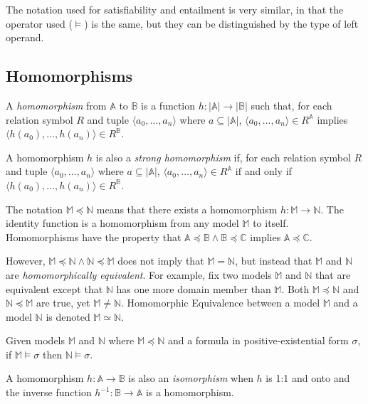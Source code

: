 		The notation used for satisfiability and entailment is very similar, in
		that the operator used ($\models$) is the same, but they can be
		distinguished by the type of left operand.

	\subsection{Homomorphisms}

		A \emph{homomorphism} from $\mathbb{A}$ to $\mathbb{B}$ is a function
		$h: |\mathbb{A}|\to|\mathbb{B}|$ such that, for each relation symbol
		$R$ and tuple $\langle a_0 , \ldots , a_n \rangle$ where $a \subseteq
		|\mathbb{A}|$, $\langle a_0 , \ldots , a_n  \rangle \in R^\mathbb{A}$
		implies $\langle h(a_0) , \ldots , h(a_n) \rangle \in R^\mathbb{B}$.

		A homomorphism $h$ is also a \emph{strong homomorphism} if, for each
		relation symbol $R$ and tuple $\langle a_0 , \ldots , a_n \rangle$
		where $a \subseteq |\mathbb{A}|$, $\langle a_0 , \ldots , a_n  \rangle
		\in R^\mathbb{A}$ if and only if $\langle h(a_0) , \ldots , h(a_n)
		\rangle \in R^\mathbb{B}$.

		The notation $\mathbb{M} \preceq \mathbb{N}$ means that there exists a
		homomorphism $h : \mathbb{M} \to \mathbb{N}$. The identity function is
		a homomorphism from any model $\mathbb{M}$ to itself.  Homomorphisms
		have the property that $\mathbb{A} \preceq \mathbb{B} \wedge \mathbb{B}
		\preceq \mathbb{C}$ implies $\mathbb{A} \preceq \mathbb{C}$.

		However, $\mathbb{M} \preceq \mathbb{N} \wedge \mathbb{N} \preceq
		\mathbb{M}$ does not imply that $\mathbb{M} = \mathbb{N}$, but instead
		that $\mathbb{M}$ and $\mathbb{N}$ are \emph{homomorphically
		equivalent}.  For example, fix two models $\mathbb{M}$ and $\mathbb{N}$
		that are equivalent except that $\mathbb{N}$ has one more domain
		member than $\mathbb{M}$. Both $\mathbb{M} \preceq \mathbb{N}$ and
		$\mathbb{N} \preceq \mathbb{M}$ are true, yet $\mathbb{M} \neq
		\mathbb{N}$. Homomorphic Equivalence between a model $\mathbb{M}$ and a
		model $\mathbb{N}$ is denoted $\mathbb{M} \simeq \mathbb{N}$.

		Given models $\mathbb{M}$ and $\mathbb{N}$ where $\mathbb{M} \preceq
		\mathbb{N}$ and a formula in positive-existential form $\sigma$, if
		$\mathbb{M} \models \sigma$ then $\mathbb{N} \models \sigma$.

		A homomorphism $h : \mathbb{A} \to \mathbb{B}$ is also an
		\emph{isomorphism} when $h$ is 1:1 and onto and the inverse function
		$h^{-1} : \mathbb{B} \to \mathbb{A}$ is a homomorphism.

